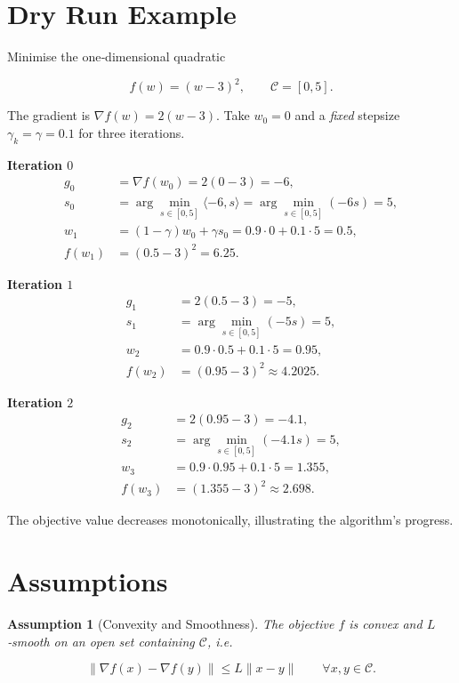 \documentclass{article}
\newtheorem{assumption}{Assumption}
\begin{document}
\section*{Dry Run Example}
Minimise the one‑dimensional quadratic  

\[
f(w)=(w-3)^2 ,\qquad \mathcal C=[0,5] .
\]

The gradient is $\nabla f(w)=2(w-3)$.  
Take $w_0=0$ and a \emph{fixed} stepsize $\gamma_k=\gamma=0.1$ for three iterations.

\medskip
\noindent\textbf{Iteration $0$}
\[
\begin{aligned}
g_0 &= \nabla f(w_0)=2(0-3)=-6,\\[2mm]
s_0 &= \arg\min_{s\in[0,5]}\langle -6,s\rangle = \arg\min_{s\in[0,5]}(-6s)=5,\\[2mm]
w_1 &= (1-\gamma)w_0+\gamma s_0 =0.9\cdot0+0.1\cdot5 =0.5,\\[2mm]
f(w_1) &= (0.5-3)^2 = 6.25 .
\end{aligned}
\]

\noindent\textbf{Iteration $1$}
\[
\begin{aligned}
g_1 &= 2(0.5-3) = -5,\\
s_1 &= \arg\min_{s\in[0,5]}(-5s)=5,\\
w_2 &= 0.9\cdot0.5+0.1\cdot5 =0.95,\\
f(w_2) &= (0.95-3)^2 \approx 4.2025 .
\end{aligned}
\]

\noindent\textbf{Iteration $2$}
\[
\begin{aligned}
g_2 &= 2(0.95-3) = -4.1,\\
s_2 &= \arg\min_{s\in[0,5]}(-4.1s)=5,\\
w_3 &= 0.9\cdot0.95+0.1\cdot5 =1.355,\\
f(w_3) &= (1.355-3)^2 \approx 2.698 .
\end{aligned}
\]

The objective value decreases monotonically, illustrating the algorithm’s progress.

\newpage
\section*{Assumptions}
\begin{assumption}[Convexity and Smoothness]\label{ass:convex-smooth}
The objective $f$ is convex and $L$‑smooth on an open set containing $\mathcal C$, i.e.  

\[
\|\nabla f(x)-\nabla f(y)\|\le L\|x-y\|\qquad\forall x,y\in\mathcal C .
\]
\end{assumption}
\end{document}
